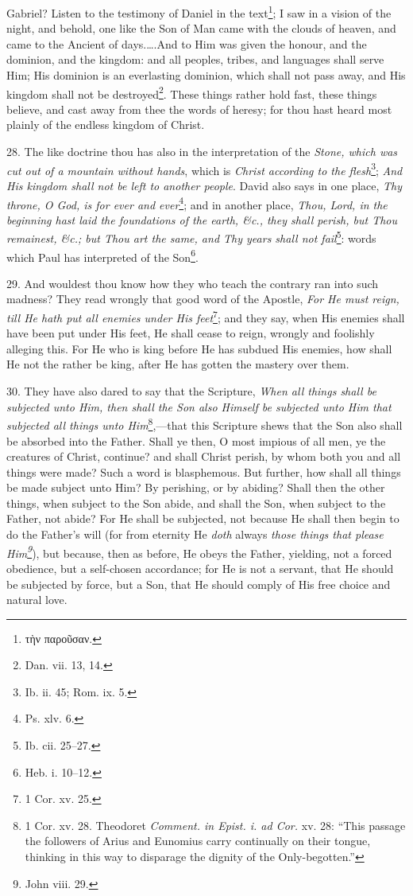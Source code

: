 Gabriel? Listen to the testimony of Daniel in the text\footnote{\textgreek{τὴν παροῦσαν}.}; I saw in a vision of the night, and behold, one like the Son of Man came with the clouds of heaven, and came to the Ancient of days.….And to Him was given the honour, and the dominion, and the kingdom: and all peoples, tribes, and languages shall serve Him; His dominion is an everlasting dominion, which shall not pass away, and His kingdom shall not be destroyed\footnote{Dan. vii. 13, 14.}. These things rather hold fast, these things believe, and cast away from thee the words of heresy; for thou hast heard most plainly of the endless kingdom of Christ.

28. The like doctrine thou has also in the interpretation of the \emph{Stone, which was cut out of a mountain without hands}, which is \emph{Christ according to the flesh}\footnote{Ib. ii. 45; Rom. ix. 5.}; \emph{And His kingdom shall not be left to another people}. David also says in one place, \emph{Thy throne, O God, is for ever and ever}\footnote{Ps. xlv. 6.}; and in another place, \emph{Thou, Lord, in the beginning hast laid the foundations of the earth, \&c., they shall perish, but Thou remainest, \&c.; but Thou art the same, and Thy years shall not fail}\footnote{Ib. cii. 25–27.}: words which Paul has interpreted of the Son\footnote{Heb. i. 10–12.}.

29. And wouldest thou know how they who teach the contrary ran into such madness? They read wrongly that good word of the Apostle, \emph{For He must reign, till He hath put all enemies under His feet}\footnote{1 Cor. xv. 25.}; and they say, when His enemies shall have been put under His feet, He shall cease to reign, wrongly and foolishly alleging this. For He who is king before He has subdued His enemies, how shall He not the rather be king, after He has gotten the mastery over them.

30. They have also dared to say that the Scripture, \emph{When all things shall be subjected unto Him, then shall the Son also Himself be subjected unto Him that subjected all things unto Him}\footnote{1 Cor. xv. 28. Theodoret \emph{Comment. in Epist. i. ad Cor.} xv. 28: “This passage the followers of Arius and Eunomius carry continually on their tongue, thinking in this way to disparage the dignity of the Only-begotten.”},—that this Scripture shews that the Son also shall be absorbed into the Father. Shall ye then, O most impious of all men, ye the creatures of Christ, continue? and shall Christ perish, by whom both you and all things were made? Such a word is blasphemous. But further, how shall all things be made subject unto Him? By perishing, or by abiding? Shall then the other things, when subject to the Son abide, and shall the Son, when subject to the Father, not abide? For He shall be subjected, not because He shall then begin to do the Father’s will (for from eternity He \emph{doth} always \emph{those things that please Him\footnote{John viii. 29.}}), but because, then as before, He obeys the Father, yielding, not a forced obedience, but a self-chosen accordance; for He is not a servant, that He should be subjected by force, but a Son, that He should comply of His free choice and natural love.

